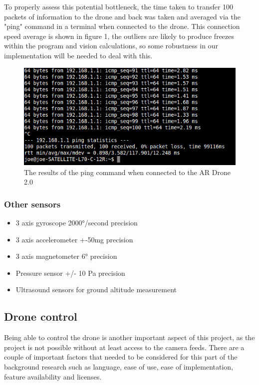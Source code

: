  To properly assess this potential bottleneck, the time taken to transfer 100 packets of information to the drone and back was taken and averaged via the "ping" command in a terminal when connected to the drone. This connection speed average is shown in figure 1, the outliers are likely to produce freezes within the program and vision calculations, so some robustness in our implementation will be needed to deal with this.

\begin{figure}
\centering
\includegraphics[scale=0.5]{PingScreen.png}
\caption{The results of the ping command when connected to the AR Drone 2.0}
\end{figure}
\subsubsection{Other sensors}
\begin{itemize}
  \item 3 axis gyroscope 2000°/second precision
  \item 3 axis accelerometer +-50mg precision
  \item 3 axis magnetometer 6° precision
  \item Pressure sensor +/- 10 Pa precision
  \item Ultrasound sensors for ground altitude measurement
\end{itemize}


\subsection{Drone control}
Being able to control the drone is another important aspect of this project, as the project is not possible without at least access to the camera feeds. There are a couple of important factors that needed to be considered for this part of the background research such as language, ease of use, ease of implementation, feature availability and licenses.


